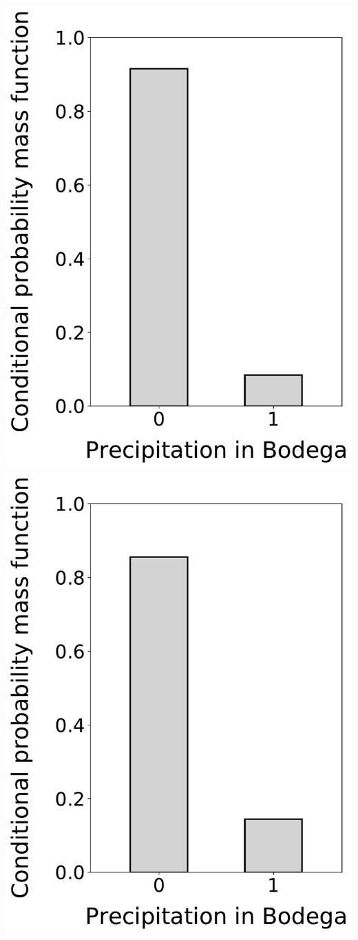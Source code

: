 \documentclass[12pt,twoside]{article}
\begin{document}
\begin{enumerate}
\includegraphics[scale=.5]{precipitation_cond_pmf_1_given_2eq1_3eq0.pdf}
\includegraphics[scale=.5]{precipitation_cond_pmf_1_given_2eq1_3eq1.pdf}

\end{enumerate}
\end{document}
